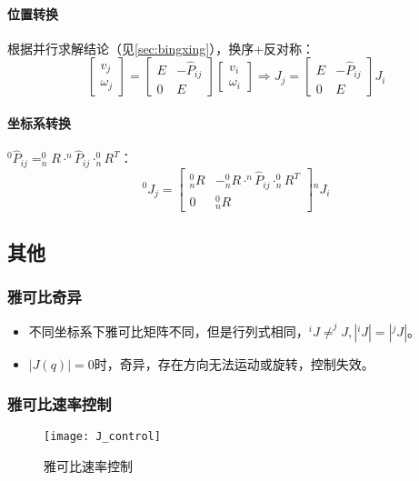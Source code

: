 \documentclass[
12pt, %
a4paper, 
oneside, %
headinclude,footinclude, %
]{scrartcl}
\begin{document}
\paragraph{位置转换}
根据并行求解结论（见\ref{sec:bingxing}），换序+反对称：
$$ 
\begin{bmatrix} v_j \\ \omega_j \end{bmatrix} 
= \begin{bmatrix} E & -\hat{P}_{ij} \\ 0 & E \end{bmatrix} \begin{bmatrix} v_i \\ \omega_i \end{bmatrix} 
\Rightarrow J_j = \begin{bmatrix} E & -\hat{P}_{ij} \\ 0 & E \end{bmatrix} J_i
$$ 
\paragraph{坐标系转换}
$ ^0\hat{P}_{ij} = ^0_n R \cdot ^n\hat{P}_{ij} \cdot ^0_n R^T $：
$$ ^0 J_j = \begin{bmatrix} ^0_n R & -^0_n R \cdot ^n\hat{P}_{ij} \cdot ^0_n R^T \\ 0 & ^0_n R \end{bmatrix} {}^n J_i $$
\subsection[其他]{其他}
\subsubsection[雅可比奇异]{雅可比奇异}
\begin{itemize}
\item 不同坐标系下雅可比矩阵不同，但是行列式相同，$ ^i J \neq ^j J, |^i J| = |^j J| $。
\item $ |J(q)| = 0 $时，奇异，存在方向无法运动或旋转，控制失效。
\end{itemize} 
\subsubsection[雅可比速率控制]{雅可比速率控制}
\begin{figure}[H]
\centering 
\texttt{[image: J\_control]} 
\caption[雅可比速率控制]{雅可比速率控制}
\end{figure}
\end{document}
